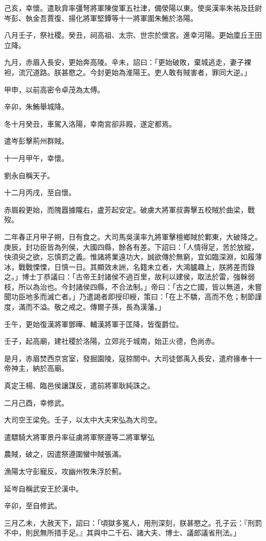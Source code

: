 \begin{pinyinscope}
己亥，幸懷。遣耿弇率彊弩將軍陳俊軍五社津，備滎陽以東。使吳漢率朱祐及廷尉岑彭、執金吾賈復、揚化將軍堅鐔等十一將軍圍朱鮪於洛陽。

八月壬子，祭社稷。癸丑，祠高祖、太宗、世宗於懷宮。進幸河陽。更始廩丘王田立降。

九月，赤眉入長安，更始奔高陵。辛未，詔曰：「更始破敗，棄城逃走，妻子裸袒，流冗道路。朕甚愍之。今封更始為淮陽王。吏人敢有賊害者，罪同大逆。」

甲申，以前高密令卓茂為太傅。

辛卯，朱鮪舉城降。

冬十月癸丑，車駕入洛陽，幸南宮卻非殿，遂定都焉。

遣岑彭擊荊州群賊。

十一月甲午，幸懷。

劉永自稱天子。

十二月丙戌，至自懷。

赤眉殺更始，而隗囂據隴右，盧芳起安定。破虜大將軍叔壽擊五校賊於曲梁，戰歿。

二年春正月甲子朔，日有食之。大司馬吳漢率九將軍擊檀鄉賊於鄴東，大破降之。庚辰，封功臣皆為列侯，大國四縣，餘各有差。下詔曰：「人情得足，苦於放縱，快須臾之欲，忘慎罰之義。惟諸將業遠功大，誠欲傳於無窮，宜如臨深淵，如履薄冰，戰戰慄慄，日慎一日。其顯效未詶，名籍未立者，大鴻臚趣上，朕將差而錄之。」博士丁恭議曰：「古帝王封諸侯不過百里，故利以建侯，取法於雷，強榦弱枝，所以為治也。今封諸侯四縣，不合法制。」帝曰：「古之亡國，皆以無道，未嘗聞功臣地多而滅亡者。」乃遣謁者即授印綬，策曰：「在上不驕，高而不危；制節謹度，滿而不溢。敬之戒之。傳爾子孫，長為漢藩。」

壬午，更始復漢將軍鄧曄、輔漢將軍于匡降，皆復爵位。

壬子，起高廟，建社稷於洛陽，立郊兆于城南，始正火德，色尚赤。

是月，赤眉焚西京宮室，發掘園陵，寇掠關中。大司徒鄧禹入長安，遣府掾奉十一帝神主，納於高廟。

真定王楊、臨邑侯讓謀反，遣前將軍耿純誅之。

二月己酉，幸修武。

大司空王梁免。壬子，以太中大夫宋弘為大司空。

遣驃騎大將軍景丹率征虜將軍祭遵等二將軍擊弘

農賊，破之，因遣祭遵圍蠻中賊張滿。

漁陽太守彭寵反，攻幽州牧朱浮於薊。

延岑自稱武安王於漢中。

辛卯，至自修武。

三月乙未，大赦天下，詔曰：「頃獄多冤人，用刑深刻，朕甚愍之。孔子云：『刑罰不中，則民無所措手足。』其與中二千石、諸大夫、博士、議郎議省刑法。」


\end{pinyinscope}
